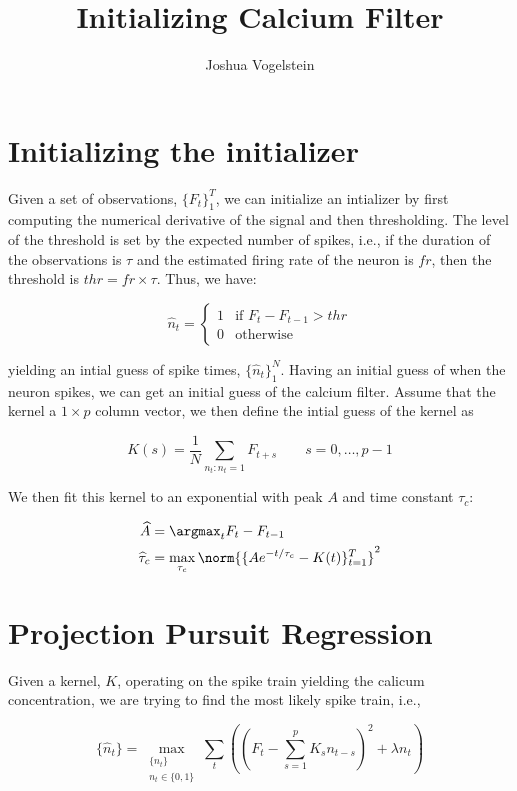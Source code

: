 \documentclass{article}
\title{Initializing Calcium Filter}
\author{Joshua Vogelstein}
\begin{document}
\section{Initializing the initializer}

Given a set of observations, $\{F_t\}_1^T$, we can initialize an intializer by first computing the numerical derivative of the signal and then thresholding.  The level of the threshold is set by the expected number of spikes, i.e., if the duration of the observations is $\tau$ and the estimated firing rate of the neuron is $fr$, then the threshold is $thr = fr \times \tau$.  Thus, we have:

\begin{equation}
\widehat{n}_t = 
\begin{cases}
1 & \text{if } F_t - F_{t-1} > thr\\
0 & \text{otherwise}
\end{cases}
\end{equation}

yielding an intial guess of spike times, $\{\widehat{n}_t\}_1^N$. Having an initial guess of when the neuron spikes, we can get an initial guess of the calcium filter.  Assume that the kernel a $1 \times p$ column vector, we then define the intial guess of the kernel as

\begin{equation}
K(s) =  \frac{1}{N}\sum_{n_t: n_t =1} F_{t+s} \qquad s=0,\ldots,p-1
\end{equation}

We then fit this kernel to an exponential with peak $A$ and time constant $\tau_c$:

\begin{align}
\widehat{A} &= \argmax_t F_t - F_{t-1}\\
\widehat{\tau}_c &= \max_{\tau_c} \norm{\{A e^{-t/\tau_c} - K(t)\}_{t=1}^T}^2
\end{align}


\section{Projection Pursuit Regression}

Given a kernel, $K$, operating on the spike train yielding the calicum concentration, we are trying to find the most likely spike train, i.e.,

\begin{equation}
\{\widehat{n}_t\}=\max_{\substack{\{n_t\}\\ n_t \in \{0,1\}}}\sum_t \left( \left(F_t - \sum_{s=1}^p K_{s} n_{t-s}\right)^2 + \lambda n_t\right)
\end{equation}
\end{document}
